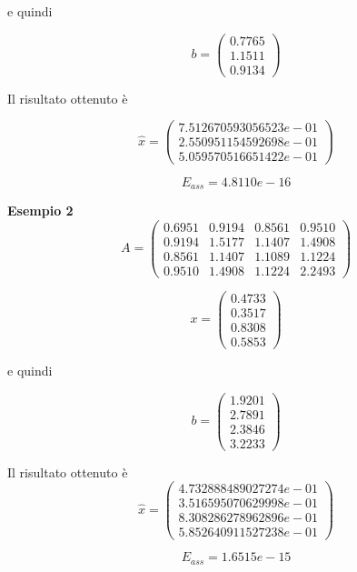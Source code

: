 e quindi

\[
b = \begin{pmatrix}
0.7765\\
1.1511\\
0.9134
\end{pmatrix}
\]

Il risultato ottenuto è

\[
\hat{x} = \begin{pmatrix}
7.512670593056523e-01\\
2.550951154592698e-01\\
5.059570516651422e-01
\end{pmatrix}
\]

\[
E_{ass} = 4.8110e-16
\]

\textbf{Esempio 2}
\[
A = \begin{pmatrix}
0.6951 & 0.9194 & 0.8561 & 0.9510\\
0.9194 & 1.5177 & 1.1407 & 1.4908\\
0.8561 & 1.1407 & 1.1089 & 1.1224\\
0.9510 & 1.4908 & 1.1224 & 2.2493
\end{pmatrix}
\]

\[
x = \begin{pmatrix}
0.4733\\
0.3517\\
0.8308\\
0.5853
\end{pmatrix}
\]

e quindi

\[
b = \begin{pmatrix}
1.9201\\
2.7891\\
2.3846\\
3.2233
\end{pmatrix}
\]

Il risultato ottenuto è
\[
\hat{x} = \begin{pmatrix}
4.732888489027274e-01\\
3.516595070629998e-01\\
8.308286278962896e-01\\
5.852640911527238e-01

\end{pmatrix}
\]

\[
E_{ass} = 1.6515e-15
\]
